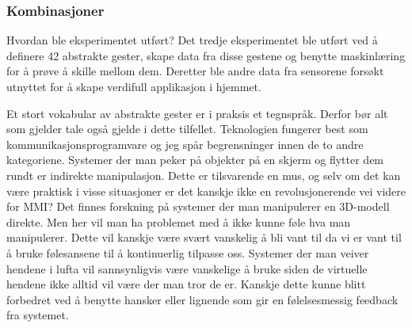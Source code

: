 \subsubsection*{Kombinasjoner}
{\color{red}Hvordan ble eksperimentet utført?}
Det tredje eksperimentet ble utført ved å definere 42 abstrakte gester, skape data fra disse gestene og benytte maskinlæring for å prøve å skille mellom dem. Deretter ble andre data fra sensorene forsøkt utnyttet for å skape verdifull applikasjon i hjemmet.

Et stort vokabular av abstrakte gester er i praksis et tegnspråk. Derfor bør alt som gjelder tale også gjelde i dette tilfellet. Teknologien fungerer best som kommunikasjonsprogramvare og jeg spår begrensninger innen de to andre kategoriene. Systemer der man peker på objekter på en skjerm og flytter dem rundt er indirekte manipulasjon. Dette er tilsvarende en mus, og selv om det kan være praktisk i visse situasjoner er det kanskje ikke en revolusjonerende vei videre for MMI? Det finnes forskning på systemer der man manipulerer en 3D-modell direkte. Men her vil man ha problemet med å ikke kunne føle hva man manipulerer. Dette vil kanskje være svært vanskelig å bli vant til da vi er vant til å bruke følesansene til å kontinuerlig tilpasse oss. Systemer der man veiver hendene i lufta vil sannsynligvis være vanskelige å bruke siden de virtuelle hendene ikke alltid vil være der man tror de er. Kanskje dette kunne blitt forbedret ved å benytte hansker eller lignende som gir en følelsesmessig feedback fra systemet.

